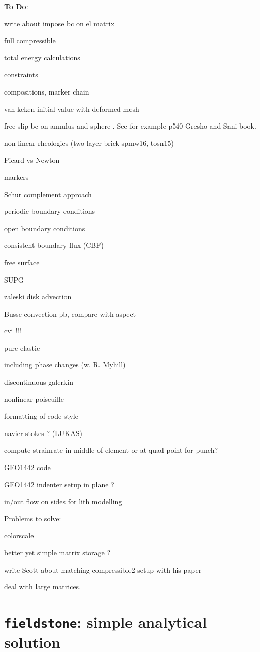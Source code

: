 \documentclass[a4paper]{article}
\begin{document}
\newpage
{\bf To Do}:

write about impose bc on el matrix

full compressible 

total energy calculations

constraints

compositions, marker chain

van keken initial value with deformed mesh

free-slip bc on annulus and sphere . See for example p540 Gresho and Sani book.

non-linear rheologies (two layer brick spmw16, tosn15) 

Picard vs Newton

markers

Schur complement approach

periodic boundary conditions

open boundary conditions

consistent boundary flux (CBF)

free surface 

SUPG

zaleski disk advection

Busse convection pb, compare with aspect 

cvi !!!

pure elastic 

including phase changes (w. R. Myhill)

discontinuous galerkin

nonlinear poiseuille

formatting of code style

navier-stokes ? (LUKAS)

compute strainrate in middle of element or at quad point for punch?

GEO1442 code 

GEO1442 indenter setup in plane ?

in/out flow on sides for lith modelling

\noindent Problems to solve:

colorscale 

better yet simple matrix storage ?

write Scott about matching compressible2 setup with his paper

deal with large matrices. 


\newpage
\section{{\tt fieldstone}: simple analytical solution \label{f1}}

\end{document}

